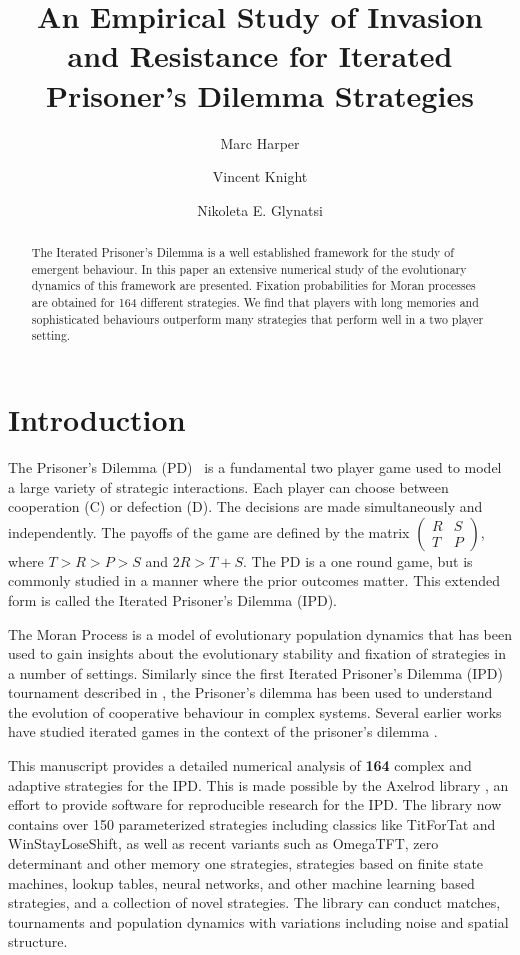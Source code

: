 \documentclass{article}
\title{An Empirical Study of Invasion and Resistance for Iterated Prisoner's Dilemma Strategies}
\author{Marc Harper \and Vincent Knight \and Nikoleta E. Glynatsi} %
\date{}
\begin{document}
\maketitle

\begin{abstract}
    The Iterated Prisoner's Dilemma is a well established framework for
    the study of emergent behaviour. In this paper an extensive numerical
    study of the evolutionary dynamics of this framework are presented. Fixation
    probabilities for Moran processes are obtained for 164
    different strategies. We find that players with long memories and
    sophisticated behaviours outperform many strategies that perform well
    in a two player setting.
\end{abstract}

\section{Introduction}\label{sec:introduction}

The Prisoner's Dilemma (PD)~\cite{Flood1958} is a fundamental two player game
used to model a large variety of strategic interactions. Each player can choose
between cooperation (C) or defection (D). The decisions are made simultaneously
and independently. The payoffs of
the game are defined by the matrix $\begin{pmatrix} R & S \\ T & P
\end{pmatrix}$, where $T > R > P > S$ and $2R > T + S$. The PD is a one
round game, but is commonly studied in a manner where the prior outcomes
matter. This extended form is called the Iterated Prisoner's
Dilemma (IPD).

The Moran Process \cite{Moran1957} is a model of
evolutionary population dynamics that has been used to gain insights about the
evolutionary stability and fixation of strategies in a number of settings.
Similarly since the first Iterated Prisoner's Dilemma (IPD) tournament described in
\cite{Axelrod1980a}, the Prisoner's dilemma has been used to understand the
evolution of cooperative behaviour in complex systems. Several earlier
works have studied iterated games in the context of the prisoner's dilemma
\cite{Nowak, Stewart2012}.

This manuscript provides a detailed numerical analysis of \textbf{164} complex
and adaptive strategies for the IPD\@. This is made possible by the Axelrod
library \cite{axelrodproject}, an effort to provide software for reproducible
research for the IPD\@. The library now contains over 150 parameterized
strategies including classics like TitForTat and WinStayLoseShift, as well as
recent variants such as OmegaTFT, zero determinant and other memory one
strategies, strategies based on finite state machines, lookup tables, neural
networks, and other machine learning based strategies, and a collection of novel
strategies. The library can conduct matches, tournaments and population
dynamics with variations including noise and spatial structure.
\end{document}
